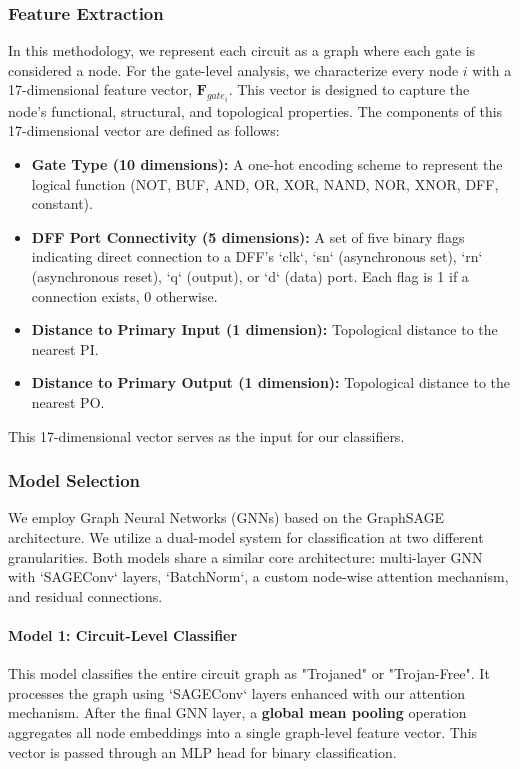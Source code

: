 \documentclass[conference]{IEEEtran}
\begin{document}
\subsubsection{Feature Extraction}
\label{sub:feature_extraction_A}
In this methodology, we represent each circuit as a graph where each gate is considered a node. For the gate-level analysis, we characterize every node $i$ with a 17-dimensional feature vector, $\mathbf{F}_{gate_i}$. This vector is designed to capture the node's functional, structural, and topological properties. The components of this 17-dimensional vector are defined as follows:
\begin{itemize}
    \item \textbf{Gate Type (10 dimensions):} A one-hot encoding scheme to represent the logical function (NOT, BUF, AND, OR, XOR, NAND, NOR, XNOR, DFF, constant).
    \item \textbf{DFF Port Connectivity (5 dimensions):} A set of five binary flags indicating direct connection to a DFF's `clk`, `sn` (asynchronous set), `rn` (asynchronous reset), `q` (output), or `d` (data) port. Each flag is 1 if a connection exists, 0 otherwise.
    \item \textbf{Distance to Primary Input (1 dimension):} Topological distance to the nearest PI.
    \item \textbf{Distance to Primary Output (1 dimension):} Topological distance to the nearest PO.
\end{itemize}
This 17-dimensional vector serves as the input for our classifiers.

\subsubsection{Model Selection}
We employ Graph Neural Networks (GNNs) based on the GraphSAGE architecture. We utilize a dual-model system for classification at two different granularities. Both models share a similar core architecture: multi-layer GNN with `SAGEConv` layers, `BatchNorm`, a custom node-wise attention mechanism, and residual connections.

\paragraph{Model 1: Circuit-Level Classifier}
This model classifies the entire circuit graph as "Trojaned" or "Trojan-Free". It processes the graph using `SAGEConv` layers enhanced with our attention mechanism. After the final GNN layer, a \textbf{global mean pooling} operation aggregates all node embeddings into a single graph-level feature vector. This vector is passed through an MLP head for binary classification.
\end{document}
